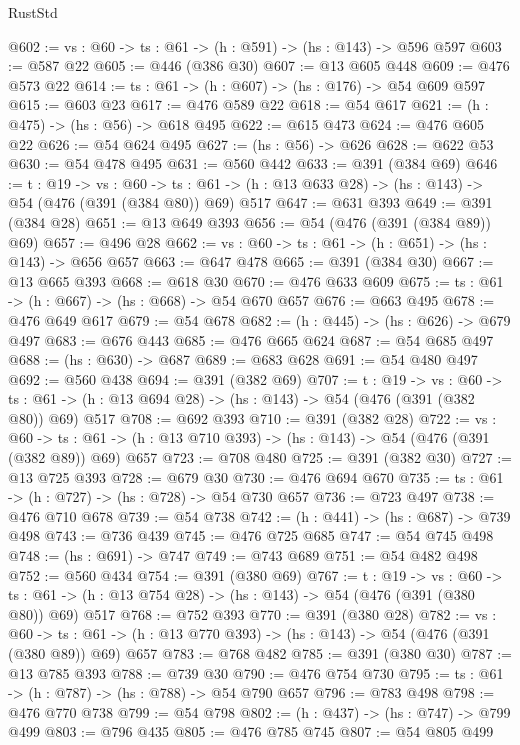 \begin{lexlean}{RustStd}
\begin{coremodule}
{\begin{coremodule}
{{{{{{{{{{{{{{{{{{{{{{{{{{{{{{{{{{{{{{@602 := {vs : @60} -> {ts : @61} -> (h : @591) -> (hs : @143) -> @596 @597
@603 := @587 @22
@605 := @446 (@386 @30)
@607 := @13 @605 @448
@609 := @476 @573 @22
@614 := {ts : @61} -> (h : @607) -> (hs : @176) -> @54 @609 @597
@615 := @603 @23
@617 := @476 @589 @22
@618 := @54 @617
@621 := (h : @475) -> (hs : @56) -> @618 @495
@622 := @615 @473
@624 := @476 @605 @22
@626 := @54 @624 @495
@627 := (hs : @56) -> @626
@628 := @622 @53
@630 := @54 @478 @495
@631 := @560 @442
@633 := @391 (@384 @69)
@646 := {t : @19} ->
  {vs : @60} ->
  {ts : @61} -> (h : @13 @633 @28) -> (hs : @143) -> @54 (@476 (@391 (@384 @80)) @69) @517
@647 := @631 @393
@649 := @391 (@384 @28)
@651 := @13 @649 @393
@656 := @54 (@476 (@391 (@384 @89)) @69)
@657 := @496 @28
@662 := {vs : @60} -> {ts : @61} -> (h : @651) -> (hs : @143) -> @656 @657
@663 := @647 @478
@665 := @391 (@384 @30)
@667 := @13 @665 @393
@668 := @618 @30
@670 := @476 @633 @609
@675 := {ts : @61} -> (h : @667) -> (hs : @668) -> @54 @670 @657
@676 := @663 @495
@678 := @476 @649 @617
@679 := @54 @678
@682 := (h : @445) -> (hs : @626) -> @679 @497
@683 := @676 @443
@685 := @476 @665 @624
@687 := @54 @685 @497
@688 := (hs : @630) -> @687
@689 := @683 @628
@691 := @54 @480 @497
@692 := @560 @438
@694 := @391 (@382 @69)
@707 := {t : @19} ->
  {vs : @60} ->
  {ts : @61} -> (h : @13 @694 @28) -> (hs : @143) -> @54 (@476 (@391 (@382 @80)) @69) @517
@708 := @692 @393
@710 := @391 (@382 @28)
@722 := {vs : @60} ->
  {ts : @61} -> (h : @13 @710 @393) -> (hs : @143) -> @54 (@476 (@391 (@382 @89)) @69) @657
@723 := @708 @480
@725 := @391 (@382 @30)
@727 := @13 @725 @393
@728 := @679 @30
@730 := @476 @694 @670
@735 := {ts : @61} -> (h : @727) -> (hs : @728) -> @54 @730 @657
@736 := @723 @497
@738 := @476 @710 @678
@739 := @54 @738
@742 := (h : @441) -> (hs : @687) -> @739 @498
@743 := @736 @439
@745 := @476 @725 @685
@747 := @54 @745 @498
@748 := (hs : @691) -> @747
@749 := @743 @689
@751 := @54 @482 @498
@752 := @560 @434
@754 := @391 (@380 @69)
@767 := {t : @19} ->
  {vs : @60} ->
  {ts : @61} -> (h : @13 @754 @28) -> (hs : @143) -> @54 (@476 (@391 (@380 @80)) @69) @517
@768 := @752 @393
@770 := @391 (@380 @28)
@782 := {vs : @60} ->
  {ts : @61} -> (h : @13 @770 @393) -> (hs : @143) -> @54 (@476 (@391 (@380 @89)) @69) @657
@783 := @768 @482
@785 := @391 (@380 @30)
@787 := @13 @785 @393
@788 := @739 @30
@790 := @476 @754 @730
@795 := {ts : @61} -> (h : @787) -> (hs : @788) -> @54 @790 @657
@796 := @783 @498
@798 := @476 @770 @738
@799 := @54 @798
@802 := (h : @437) -> (hs : @747) -> @799 @499
@803 := @796 @435
@805 := @476 @785 @745
@807 := @54 @805 @499
}}}}}}}}}}}}}}}}}}}}}}}}}}}}}}}}}}}}}}
\end{coremodule}}
\end{coremodule}
\end{lexlean}
